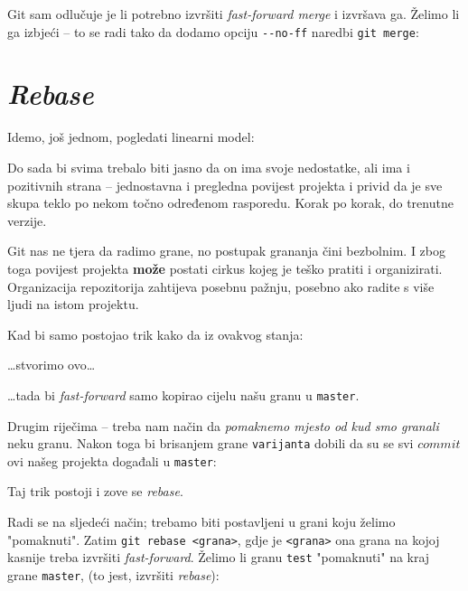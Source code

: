 Git sam odlučuje je li potrebno izvršiti \emph{fast-forward merge} i izvršava ga.
Želimo li ga izbjeći -- to se radi tako da dodamo opciju \verb+--no-ff+ naredbi \verb+git merge+:


\section*{\emph{Rebase}}

Idemo, još jednom, pogledati linearni model:



Do sada bi svima trebalo biti jasno da on ima svoje nedostatke, ali ima i pozitivnih strana -- jednostavna i pregledna povijest projekta i privid da je sve skupa teklo po nekom točno određenom rasporedu.
Korak po korak, do trenutne verzije.

Git nas ne tjera da radimo grane, no postupak grananja čini bezbolnim. 
I zbog toga povijest projekta \textbf{može} postati cirkus kojeg je teško pratiti i organizirati.
Organizacija repozitorija zahtijeva posebnu pažnju, posebno ako radite s više ljudi na istom projektu.

Kad bi samo postojao trik kako da iz ovakvog stanja:



\dots{}stvorimo ovo\dots



\dots{}tada bi \emph{fast-forward} samo kopirao cijelu našu granu u \verb+master+.

Drugim riječima -- treba nam način da \emph{pomaknemo mjesto od kud smo granali} neku granu. 
Nakon toga bi brisanjem grane \verb+varijanta+ dobili da su se svi $commit$ovi našeg projekta događali u \verb+master+:



Taj trik postoji i zove se \emph{rebase}.

Radi se na sljedeći način; trebamo biti postavljeni u grani koju želimo "pomaknuti". Zatim \verb+git rebase <grana>+, gdje je \verb+<grana>+ ona grana na kojoj kasnije treba izvršiti \emph{fast-forward}. 
Želimo li granu \verb+test+ "pomaknuti" na kraj grane \verb+master+, (to jest, izvršiti \emph{rebase}):


